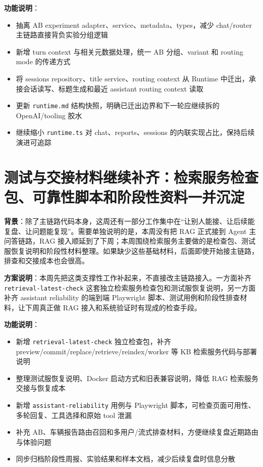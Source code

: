 \documentclass[UTF8]{ctexart}
\begin{document}
\textbf{功能说明}：
\begin{itemize}
\item 抽离 AB experiment adapter、service、metadata、types，减少 chat/router 主链路直接背负实验分组逻辑
\item 新增 turn context 与相关元数据处理，统一 AB 分组、variant 和 routing mode 的传递方式
\item 将 sessions repository、title service、routing context 从 Runtime 中迁出，承接会话读写、标题生成和最近 assistant routing context 读取
\item 更新 \texttt{runtime.md} 结构快照，明确已迁出边界和下一轮应继续拆的 OpenAI/tooling 胶水
\item 继续缩小 \texttt{runtime.ts} 对 chat、reports、sessions 的内联实现占比，保持后续演进可追踪
\end{itemize}

\section{测试与交接材料继续补齐：检索服务检查包、可靠性脚本和阶段性资料一并沉淀}

\textbf{背景}：除了主链路代码本身，这周还有一部分工作集中在“让别人能接、让后续能复盘、让问题能复现”。需要单独说明的是，本周没有把 RAG 正式接到 Agent 主问答链路，RAG 接入顺延到了下周；本周围绕检索服务主要做的是检查包、测试服恢复说明和阶段性材料整理。如果缺少这些基础材料，后面即使开始接主链路，排查和交接成本也会很高。

\textbf{方案说明}：本周先把这类支撑性工作补起来，不直接改主链路接入。一方面补齐 \texttt{retrieval-latest-check} 这套独立检索服务检查包和测试服恢复说明，另一方面补齐 assistant reliability 的端到端 Playwright 脚本、测试用例和阶段性排查材料，让下周真正做 RAG 接入和系统验证时有现成的检查手段。

\textbf{功能说明}：
\begin{itemize}
\item 新增 \texttt{retrieval-latest-check} 独立检查包，补齐 preview/commit/replace/retrieve/reindex/worker 等 KB 检索服务代码与部署说明
\item 整理测试服恢复说明、Docker 启动方式和旧表兼容说明，降低 RAG 检索服务交接与恢复成本
\item 新增 \texttt{assistant-reliability} 用例与 Playwright 脚本，可检查页面可用性、多轮回复、工具选择和原始 tool 泄漏
\item 补充 AB、车辆报告路由召回和多用户/流式排查材料，方便继续复盘近期路由与体验问题
\item 同步归档阶段性周报、实验结果和样本文档，减少后续复盘时信息分散
\end{itemize}
\end{document}
